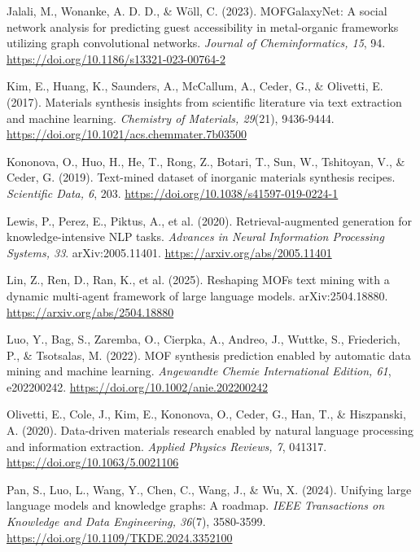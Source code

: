 \documentclass[11pt,a4paper,oneside]{report}
\begin{document}
Jalali, M., Wonanke, A. D. D., \& Wöll, C. (2023). MOFGalaxyNet: A social network analysis for predicting guest accessibility in metal-organic frameworks utilizing graph convolutional networks. \emph{Journal of Cheminformatics, 15}, 94. \href{https://doi.org/10.1186/s13321-023-00764-2}{https://doi.org/10.1186/s13321-023-00764-2}

Kim, E., Huang, K., Saunders, A., McCallum, A., Ceder, G., \& Olivetti, E. (2017). Materials synthesis insights from scientific literature via text extraction and machine learning. \emph{Chemistry of Materials, 29}(21), 9436-9444. \href{https://doi.org/10.1021/acs.chemmater.7b03500}{https://doi.org/10.1021/acs.chemmater.7b03500}

Kononova, O., Huo, H., He, T., Rong, Z., Botari, T., Sun, W., Tshitoyan, V., \& Ceder, G. (2019). Text-mined dataset of inorganic materials synthesis recipes. \emph{Scientific Data, 6}, 203. \href{https://doi.org/10.1038/s41597-019-0224-1}{https://doi.org/10.1038/s41597-019-0224-1}

Lewis, P., Perez, E., Piktus, A., et al. (2020). Retrieval-augmented generation for knowledge-intensive NLP tasks. \emph{Advances in Neural Information Processing Systems, 33}. arXiv:2005.11401. \href{https://arxiv.org/abs/2005.11401}{https://arxiv.org/abs/2005.11401}

Lin, Z., Ren, D., Ran, K., et al. (2025). Reshaping MOFs text mining with a dynamic multi-agent framework of large language models. arXiv:2504.18880. \href{https://arxiv.org/abs/2504.18880}{https://arxiv.org/abs/2504.18880}

Luo, Y., Bag, S., Zaremba, O., Cierpka, A., Andreo, J., Wuttke, S., Friederich, P., \& Tsotsalas, M. (2022). MOF synthesis prediction enabled by automatic data mining and machine learning. \emph{Angewandte Chemie International Edition, 61}, e202200242. \href{https://doi.org/10.1002/anie.202200242}{https://doi.org/10.1002/anie.202200242}

Olivetti, E., Cole, J., Kim, E., Kononova, O., Ceder, G., Han, T., \& Hiszpanski, A. (2020). Data-driven materials research enabled by natural language processing and information extraction. \emph{Applied Physics Reviews, 7}, 041317. \href{https://doi.org/10.1063/5.0021106}{https://doi.org/10.1063/5.0021106}

Pan, S., Luo, L., Wang, Y., Chen, C., Wang, J., \& Wu, X. (2024). Unifying large language models and knowledge graphs: A roadmap. \emph{IEEE Transactions on Knowledge and Data Engineering, 36}(7), 3580-3599. \href{https://doi.org/10.1109/TKDE.2024.3352100}{https://doi.org/10.1109/TKDE.2024.3352100}
\end{document}
